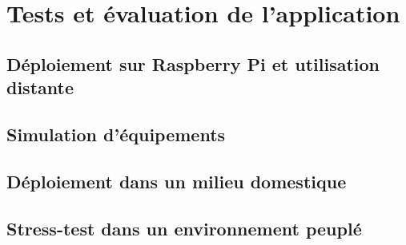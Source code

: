 \documentclass[]{article}
\begin{document}
\newpage

\section{Tests et évaluation de l'application}

\subsection{Déploiement sur Raspberry Pi et utilisation distante}
\subsection{Simulation d'équipements}

\subsection{Déploiement dans un milieu domestique}

\subsection{Stress-test dans un environnement peuplé}


\newpage



\end{document}
